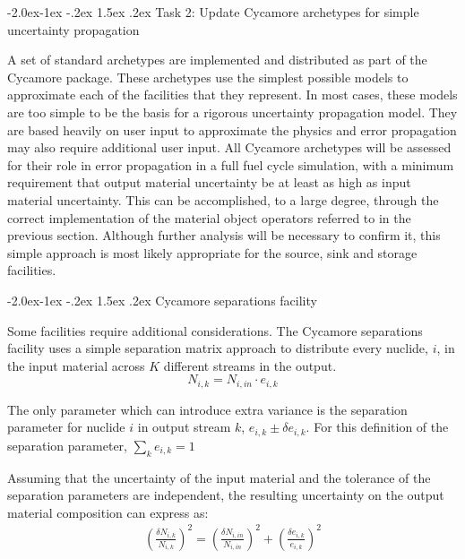 \documentclass[dvips,11pt]{article}
\makeatletter
\newcommand{\unc}[1]
{ \delta #1 }
\newcommand{\uncratio}[1]
{ \left(\frac{\unc{#1}}{#1}\right) }
\newcommand{\uncratiosq}[1]
{ \uncratio{#1}^2 }
\renewcommand\subsection{\@startsection{subsection}{2}{\z@}%
                                     {-2.0ex\@plus -1ex \@minus -.2ex}%
                                     {1.5ex \@plus .2ex}%
                                     {\normalfont\bfseries}}%
\renewcommand\subsubsection{\@startsection{subsubsection}{3}{\z@}%
                                     {-2.0ex\@plus -1ex \@minus -.2ex}%
                                     {1.5ex \@plus .2ex}%
                                     {\normalfont\bfseries}}%
\makeatother
\begin{document}
\subsection{Task 2: Update Cycamore archetypes for simple uncertainty propagation}

A set of standard archetypes are implemented and
distributed as part of the Cycamore package.
These archetypes use the simplest possible models
to approximate each of the facilities that they
represent.  In most cases, these models are too
simple to be the basis for a rigorous uncertainty
propagation model.  They are based heavily on user
input to approximate the physics and error
propagation may also require additional user
input.  All Cycamore archetypes will be assessed
for their role in error propagation in a full fuel
cycle simulation, with a minimum requirement that
output material uncertainty be at least as high as
input material uncertainty.  This can be
accomplished, to a large degree, through the
correct implementation of the material object
operators referred to in the previous section.
Although further analysis will be necessary to
confirm it, this simple approach is most likely
appropriate for the source, sink
and storage facilities.

\subsubsection{Cycamore separations facility}

Some facilities require additional considerations.
The Cycamore separations facility uses a simple
separation matrix approach to distribute every
nuclide, $i$, in the input material across $K$
different streams in the output.
\begin{equation}
N_{i,k} = N_{i,in} \cdot e_{i,k}
\end{equation}

The only parameter which can introduce extra
variance is the separation parameter for nuclide
$i$ in output stream $k$, $e_{i,k} \pm \delta
e_{i,k}$.  For this definition of the separation
parameter, $\sum_k e_{i,k} = 1$

Assuming that the uncertainty of the input
material and the tolerance of the separation
parameters are independent, the resulting
uncertainty on the output material composition can
express as:
\begin{align}
  \uncratiosq{N_{i,k}} = \uncratiosq{N_{i,in}} +  \uncratiosq{e_{i,k}}
\end{align}
\end{document}
